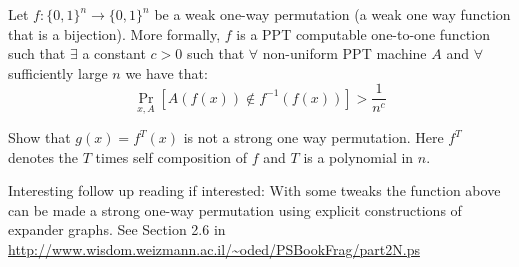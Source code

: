 \documentclass[12pt]{tufte-book}
\begin{document}
\begin{exercise}
 Let $f:\{0,1\}^n\to \{0,1\}^{n}$ be a weak one-way permutation (a weak one way function that is a bijection). More formally, $f$ is a PPT computable one-to-one function such that $\exists$ a constant $c >0$ such that $\forall$ non-uniform PPT machine $A$ and $\forall$ sufficiently large $n$ we have that:
    \[\Pr_{x,A}[A(f(x)) \not\in f^{-1}(f(x))] > \frac{1}{n^c}\]

     Show that $g(x) = f^T(x)$ is not a strong one way permutation. Here $f^T$ denotes the $T$ times self composition of $f$ and $T$ is a polynomial in $n$.

     Interesting follow up reading if interested: With some tweaks the function above can be made a strong one-way permutation using explicit constructions of expander graphs. See Section 2.6 in \url{http://www.wisdom.weizmann.ac.il/~oded/PSBookFrag/part2N.ps}
\end{exercise}
\end{document}
